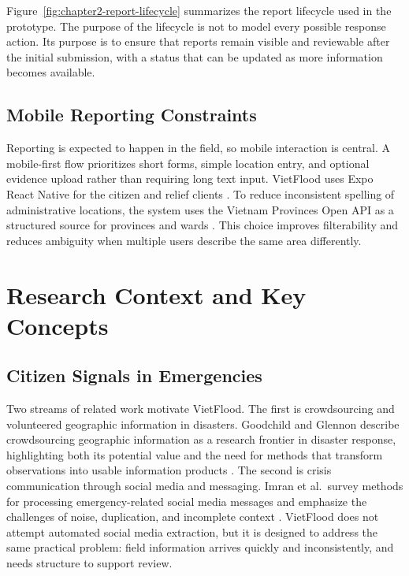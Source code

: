 Figure~\ref{fig:chapter2-report-lifecycle} summarizes the report lifecycle used in the prototype. The purpose of the lifecycle is not to model every possible response action. Its purpose is to ensure that reports remain visible and reviewable after the initial submission, with a status that can be updated as more information becomes available.

\subsection{Mobile Reporting Constraints}

Reporting is expected to happen in the field, so mobile interaction is central. A mobile-first flow prioritizes short forms, simple location entry, and optional evidence upload rather than requiring long text input. VietFlood uses Expo React Native for the citizen and relief clients \cite{expoDocs,reactNativeDocs}. To reduce inconsistent spelling of administrative locations, the system uses the Vietnam Provinces Open API as a structured source for provinces and wards \cite{vietnamProvincesOpenApi}. This choice improves filterability and reduces ambiguity when multiple users describe the same area differently.

\section{Research Context and Key Concepts}

\subsection{Citizen Signals in Emergencies}

Two streams of related work motivate VietFlood. The first is crowdsourcing and volunteered geographic information in disasters. Goodchild and Glennon describe crowdsourcing geographic information as a research frontier in disaster response, highlighting both its potential value and the need for methods that transform observations into usable information products \cite{goodchild2010crowdsourcing}. The second is crisis communication through social media and messaging. Imran et al.\ survey methods for processing emergency-related social media messages and emphasize the challenges of noise, duplication, and incomplete context \cite{imran2015processing}. VietFlood does not attempt automated social media extraction, but it is designed to address the same practical problem: field information arrives quickly and inconsistently, and needs structure to support review.


